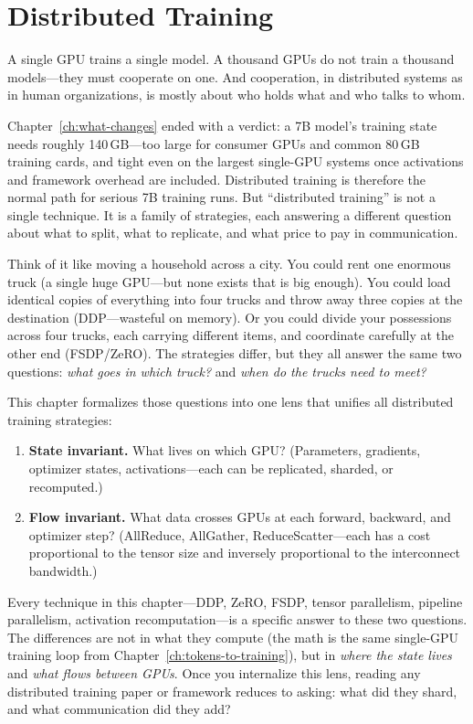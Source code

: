 \chapter{Distributed Training}
\label{ch:distributed-training}

A single GPU trains a single model. A thousand GPUs do not train a thousand models---they must cooperate on one. And cooperation, in distributed systems as in human organizations, is mostly about who holds what and who talks to whom.

Chapter~\ref{ch:what-changes} ended with a verdict: a 7B model's training state needs roughly 140\,GB---too large for consumer GPUs and common 80\,GB training cards, and tight even on the largest single-GPU systems once activations and framework overhead are included. Distributed training is therefore the normal path for serious 7B training runs. But ``distributed training'' is not a single technique. It is a family of strategies, each answering a different question about what to split, what to replicate, and what price to pay in communication.

Think of it like moving a household across a city. You could rent one enormous truck (a single huge GPU---but none exists that is big enough). You could load identical copies of everything into four trucks and throw away three copies at the destination (DDP---wasteful on memory). Or you could divide your possessions across four trucks, each carrying different items, and coordinate carefully at the other end (FSDP/ZeRO). The strategies differ, but they all answer the same two questions: \emph{what goes in which truck?} and \emph{when do the trucks need to meet?}

This chapter formalizes those questions into one lens that unifies all distributed training strategies:

\begin{enumerate}[nosep]
  \item \textbf{State invariant.} What lives on which GPU? (Parameters, gradients, optimizer states, activations---each can be replicated, sharded, or recomputed.)
  \item \textbf{Flow invariant.} What data crosses GPUs at each forward, backward, and optimizer step? (AllReduce, AllGather, ReduceScatter---each has a cost proportional to the tensor size and inversely proportional to the interconnect bandwidth.)
\end{enumerate}

Every technique in this chapter---DDP, ZeRO, FSDP, tensor parallelism, pipeline parallelism, activation recomputation---is a specific answer to these two questions. The differences are not in what they compute (the math is the same single-GPU training loop from Chapter~\ref{ch:tokens-to-training}), but in \emph{where the state lives} and \emph{what flows between GPUs}. Once you internalize this lens, reading any distributed training paper or framework reduces to asking: what did they shard, and what communication did they add?

